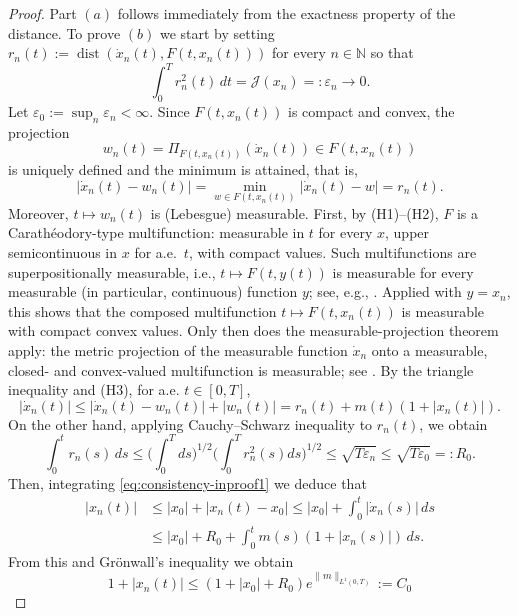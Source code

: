 \documentclass[11pt]{elsarticle}
\theoremstyle{definition}
\theoremstyle{remark}
\numberwithin{equation}{section}
\begin{document}
	\begin{proof}
		Part $(a)$ follows immediately from the exactness property of the distance. To prove $(b)$ we start by setting $r_n(t) := \operatorname{dist}(\dot{x}_n(t), F(t, x_n(t)))$ for every $n\in\mathbb{N}$ so that
		\[
		\int_0^T r_n^2(t) \, dt = \mathcal{J}(x_n) =: \varepsilon_n \to 0.
		\]
		Let $\varepsilon_0 := \sup_n \varepsilon_n < \infty$. Since  $F(t, x_n(t))$ is  compact and convex, the projection
		\[
		w_n(t) = \Pi_{F(t, x_n(t))}(\dot{x}_n(t)) \in F(t, x_n(t))
		\]
		is uniquely defined and the minimum is attained, that is,
		\[
		|\dot{x}_n(t) - w_n(t)| =\min_{w\in F(t, x_n(t))} |\dot{x}_n(t) - w| =r_n(t).
		\]
		Moreover, $t\mapsto w_n(t)$ is (Lebesgue) measurable. First, by \textup{(H1)}--\textup{(H2)}, $F$ is a Carath\'eodory-type multifunction: measurable in $t$ for every $x$, upper semicontinuous in $x$ for a.e.\ $t$, with compact values. Such multifunctions are superpositionally measurable, i.e., $t\mapsto F(t,y(t))$ is measurable for every measurable (in particular, continuous) function $y$; see, e.g., \cite[Chapter~8]{aubin_frankowska_2009}. Applied with $y=x_n$, this shows that the composed multifunction $t\mapsto F(t,x_n(t))$ is measurable with compact convex values. Only then does the measurable-projection theorem apply: the metric projection of the measurable function $\dot{x}_n$ onto a measurable, closed- and convex-valued multifunction is measurable; see \cite[Theorem~8.2.11]{aubin_frankowska_2009}.
		By the triangle inequality and (H3), for a.e. $t\in[0,T]$,
		\begin{equation}\label{eq:consistency-inproof1}
			|\dot{x}_n(t)| \le |\dot{x}_n(t) - w_n(t)|+|w_n(t)|= r_n(t) + m(t)(1 + |x_n(t)|).
		\end{equation}
		On the other hand, applying Cauchy–Schwarz inequality to $r_n(t)$, we obtain 
		\[
		\int_0^t r_n(s) \, ds  \le \Big(\int_0^T ds\Big)^{1/2}\Big(\int_0^T r^2_n(s)ds\Big)^{1/2}
		\leq  \sqrt{T \varepsilon_n}\le  \sqrt{T \varepsilon_0} =: R_0.
		\]
		Then, integrating \eqref{eq:consistency-inproof1} we deduce that
		\begin{align}
			|x_n(t)| & \le |x_0|  + |x_n(t)-x_0|
			\leq |x_0| + \int_0^t |\dot{x}_n(s)|\, ds
			\nonumber\\ & 
			\le |x_0| + R_0 + \int_0^t m(s)(1 + |x_n(s)|) \, ds.
			\nonumber
		\end{align}
		From this and Gr\"{o}nwall's inequality we obtain
		\begin{equation}\label{eq:consistency-inproof2}
			1 + |x_n(t)| \le (1 + |x_0| + R_0 )e^{\|m\|_{L^1(0,T)}}:=C_0

\end{equation}
\end{proof}
\end{document}
